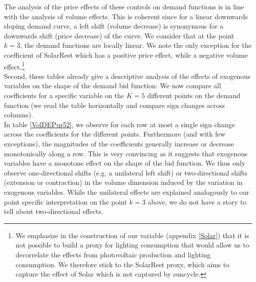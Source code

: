 The analysis of the price effects of these controls on demand functions is in line with the analysis of volume effects. This is coherent since for a linear downwards sloping demand curve, a left shift (volume decrease) is synonymous for a downwards shift (price decrease) of the curve. We consider that at the point $k=3$, the demand functions are locally linear. We note the only exception for the coefficient of SolarRest which has a positive price effect, while a negative volume effect.\footnote{We emphasize in the construction of our variable (appendix \ref{Solar}) that it is not possible to build a proxy for lighting consumption that would allow us to decorrelate the effects from photovoltaic production and lighting consumption. We therefore stick to the SolarRest proxy, which aims to capture the effect of Solar which is not captured by suncycle.} \\

Second, these tables already give a descriptive analysis of the effects of exogenous variables on the shape of the demand bid function:
We now compare all coefficients for a specific variable on the $K=5$ different points on the demand function (we read the table horizontally and compare sign changes across columns).\\

In table \ref{VolDEPur52}, we observe for each row at most a single sign change across the coefficients for the different points. Furthermore (and with few exceptions), the magnitudes of the coefficients generally increase or decrease monotonically along a row. 
This is very convincing as it suggests that exogenous variables have a monotone effect on the shape of the bid function. We thus only observe one-directional shifts (e.g. a unilateral left shift) or two-directional shifts (extension or contraction) in the volume dimension induced by the variation in exogenous variables. While the unilateral effects are explained analogously to our point specific interpretation on the point $k=3$ above, we do not have a story to tell about two-directional effects.\\

